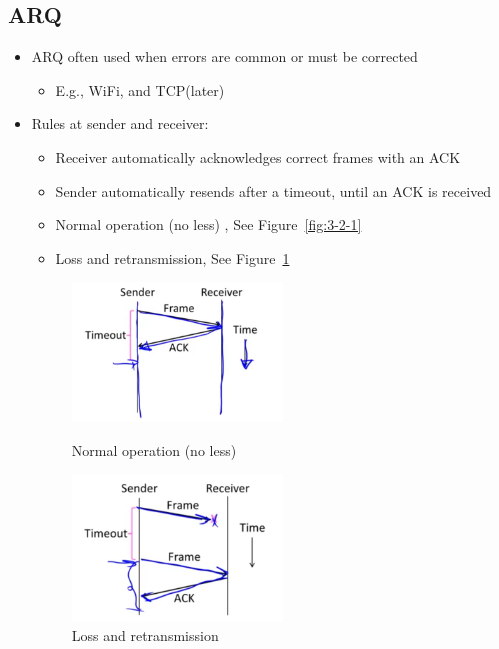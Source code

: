\documentclass[12pt]{ctexart}   %
\begin{document}
	\subsection{ARQ}
	\begin{itemize}
		\item ARQ often used when errors are common or must be corrected
		\begin{itemize}
			\item E.g., WiFi, and TCP(later)
		\end{itemize}
		
		\item Rules at sender and receiver:
		\begin{itemize}
			\item Receiver automatically acknowledges correct frames with an ACK
			\item Sender automatically resends after a timeout, until an ACK is received
			
			\item Normal operation (no less) , See Figure~\ref{fig:3-2-1}
			\item Loss and retransmission, See Figure~\ref{fig:3-2-2}
		\end{itemize}
		
		\begin{figure}
			\begin{minipage}[t]{0.5\linewidth}
				\centering
				\includegraphics[width=2.2in]{images/3-2-1}
				\caption{Normal operation (no less)}
				\label{fig:3-2-1}
			\end{minipage}
			\begin{minipage}[t]{0.5\linewidth}
				\centering
				\includegraphics[width=2.2in]{images/3-2-2}
				\caption{Loss and retransmission}
				\label{fig:3-2-2}
			\end{minipage}
		\end{figure}
	\end{itemize}
	
\end{document}
